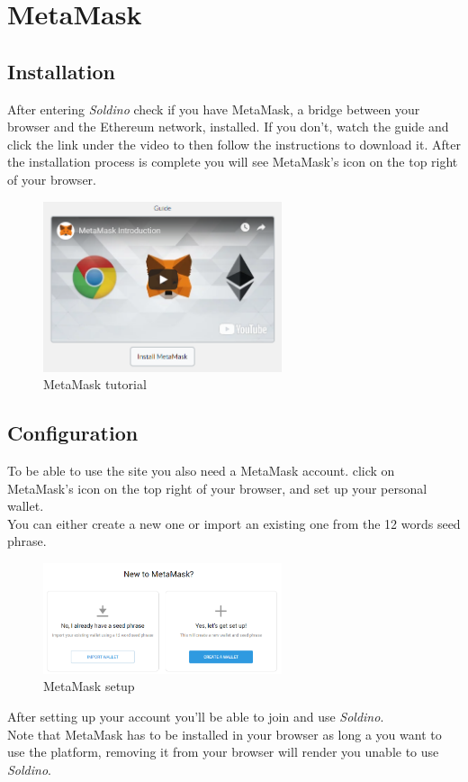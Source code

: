 \section{MetaMask}
	\subsection{Installation}
	After entering \textit{Soldino} check if you have MetaMask, a bridge between 
	your browser and the Ethereum network, installed.
	If you don't, watch the guide and click the link under the video to then 
	follow the instructions to download it. After the installation process is 
	complete you will see MetaMask's icon on the top right of your browser.\newline
	\begin{figure}[H]
		\includegraphics[width=7cm]{res/images/MetaMask_download.png}
		\centering
		\caption{MetaMask tutorial}
	\end{figure}
	\subsection{Configuration}
	To be able to use the site you also need a MetaMask account. click on 
	MetaMask's icon on the top right of your browser, and set up your 
	personal wallet.\\
	You can either create a new one or import an existing one from the 12 
	words seed phrase.
	\begin{figure}[H]
		\includegraphics[width=7cm]{res/images/metamask_select.png}
		\centering
		\caption{MetaMask setup}
	\end{figure}
	\noindent After setting up your account you'll be able to join and use 
	\textit{Soldino}.
	\newline \\
	Note that MetaMask has to be installed in your browser as long a you want 
	to use the platform, removing it from your browser will render you unable to
	use \textit{Soldino}.
